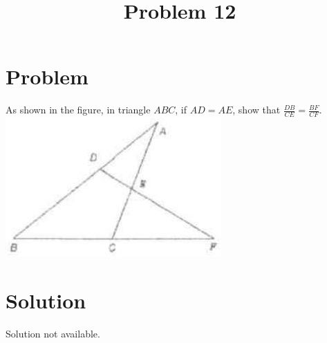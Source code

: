 \documentclass{article}
\title{Problem 12}
\date{}
\begin{document}
\maketitle

\section*{Problem}
As shown in the figure, in triangle \(A B C\), if \(A D=A E\), show that \(\frac{D B}{C E}=\frac{B F}{C F}\).\\
\centering
\includegraphics[width=\textwidth]{images/128(1).jpg}

\section*{Solution}
Solution not available.
\end{document}
